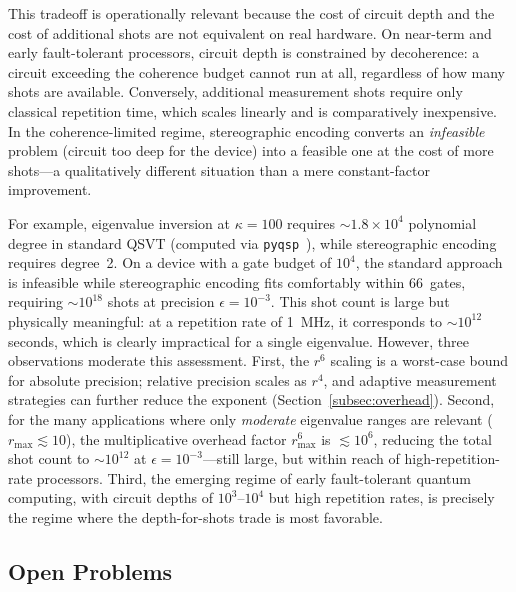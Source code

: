 This tradeoff is operationally relevant because the cost
of circuit depth and the cost of additional shots are not
equivalent on real hardware.  On near-term and early
fault-tolerant processors, circuit depth is constrained by
decoherence: a circuit exceeding the coherence budget cannot
run at all, regardless of how many shots are available.
Conversely, additional measurement shots require only
classical repetition time, which scales linearly and is
comparatively inexpensive.  In the coherence-limited regime,
stereographic encoding converts an \emph{infeasible} problem
(circuit too deep for the device) into a feasible one at
the cost of more shots---a qualitatively different situation
than a mere constant-factor improvement.

For example, eigenvalue inversion at $\kappa = 100$
requires $\sim\!1.8 \times 10^4$ polynomial degree in
standard QSVT (computed via
\texttt{pyqsp}~\cite{Martyn2024}), while stereographic
encoding requires degree~2.  On a device with a gate budget
of $10^4$, the standard approach is infeasible while
stereographic encoding fits comfortably within 66~gates,
requiring $\sim\!10^{18}$ shots at precision
$\epsilon = 10^{-3}$.  This shot count is large but
physically meaningful: at a repetition rate of 1~MHz, it
corresponds to $\sim\!10^{12}$ seconds, which is clearly
impractical for a single eigenvalue.  However, three
observations moderate this assessment.  First, the
$r^6$ scaling is a worst-case bound for absolute precision;
relative precision scales as $r^4$, and adaptive measurement
strategies can further reduce the exponent
(Section~\ref{subsec:overhead}).  Second, for the many
applications where only \emph{moderate} eigenvalue ranges
are relevant ($r_{\max} \lesssim 10$), the multiplicative
overhead factor $r_{\max}^6$ is $\lesssim 10^6$, reducing
the total shot count to $\sim\!10^{12}$ at
$\epsilon = 10^{-3}$---still large, but within reach of
high-repetition-rate processors.
Third, the emerging regime of early fault-tolerant
quantum computing, with circuit depths of
$10^3$--$10^4$ but high repetition rates, is precisely
the regime where the depth-for-shots trade is most
favorable.

\subsection{Open Problems}
\label{subsec:open}

